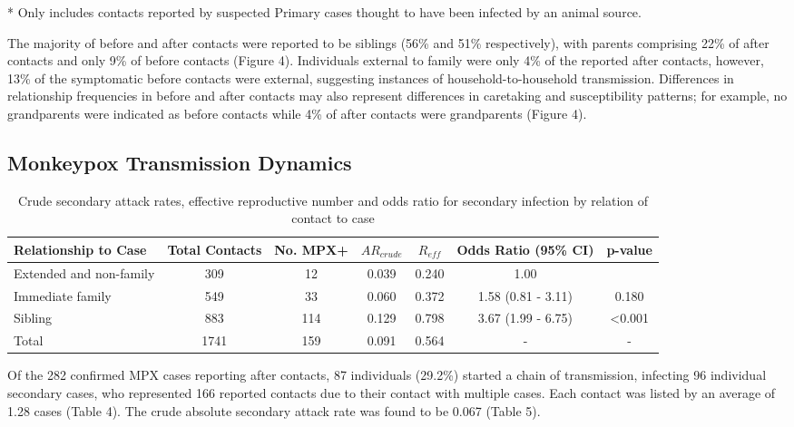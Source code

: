 * Only includes contacts reported by suspected Primary cases thought to have been infected by an animal source.


The majority of before and after contacts were reported to be siblings (56\% and 51\% respectively), with parents comprising 22\% of after contacts and only 9\% of before contacts (Figure 4). Individuals external to family were only 4\% of the reported after contacts, however, 13\% of the symptomatic before contacts were external, suggesting instances of household-to-household transmission. Differences in relationship frequencies in before and after contacts may also represent differences in caretaking and susceptibility patterns; for example, no grandparents were indicated as before contacts while 4\% of after contacts were grandparents (Figure 4).

\subsection{Monkeypox Transmission Dynamics}

\begin{table}
\centering
    \caption{Crude secondary attack rates, effective reproductive number and odds ratio for secondary infection by relation of contact to case}
    \begin{tabular}{@{}lcccccc@{}}
    \toprule
    Relationship to Case & Total Contacts  & No. MPX+ & $AR_{crude}$ & $R_{eff}$ & Odds Ratio (95\% CI)  & p-value \\
    \midrule
  Extended and non-family   &  309   &   12   & 0.039 & 0.240 & 1.00               &  ~ \\
  Immediate family  &  549   &   33   & 0.060 & 0.372 & 1.58 (0.81 - 3.11) & 0.180 \\
  Sibling           &  883   &   114  & 0.129 & 0.798 & 3.67 (1.99 - 6.75) & \textless0.001 \\
  \midrule
  Total             &  1741  &   159  & 0.091 & 0.564 & -                & - \\
    \bottomrule
    \end{tabular}
\end{table}

Of the 282 confirmed MPX cases reporting after contacts, 87 individuals (29.2\%) started a chain of transmission, infecting 96 individual secondary cases, who represented 166 reported contacts due to their contact with multiple cases. Each contact was listed by an average of 1.28 cases (Table 4). The crude absolute secondary attack rate was found to be 0.067 (Table 5).

